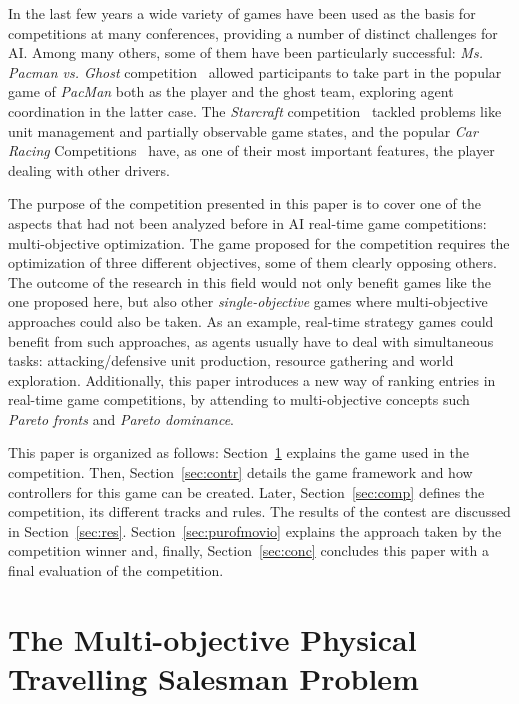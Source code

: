 \documentclass[conference]{IEEEtran}
\begin{document}
In the last few years a wide variety of games have been used as the basis for competitions at many conferences, providing a number of distinct challenges for AI. Among many others, some of them have been particularly successful: \textit{Ms. Pacman vs. Ghost} competition~\cite{Philipp2011} allowed participants to take part in the popular game of \textit{PacMan} both as the player and the ghost team, exploring agent coordination in the latter case. The \textit{Starcraft} competition~\cite{Weber2011} tackled problems like unit management and partially observable game states, and the popular \textit{Car Racing} Competitions~\cite{Loiacono2010} have, as one of their most important features, the player dealing with other drivers.

The purpose of the competition presented in this paper is to cover one of the aspects that had not been analyzed before in AI real-time game competitions: multi-objective optimization. The game proposed for the competition requires the optimization of three different objectives, some of them clearly opposing others. The outcome of the research in this field would not only benefit games like the one proposed here, but also other \textit{single-objective} games where multi-objective approaches could also be taken. As an example, real-time strategy games could benefit from such approaches, as agents usually have to deal with simultaneous tasks: attacking/defensive unit production, resource gathering and world exploration. Additionally, this paper introduces a new way of ranking entries in real-time game competitions, by attending to multi-objective concepts such \textit{Pareto fronts} and \textit{Pareto dominance}.

This paper is organized as follows: Section~\ref{sec:moptsp} explains the game used in the competition. Then, Section~\ref{sec:contr} details the game framework and how controllers for this game can be created. Later, Section~\ref{sec:comp} defines the competition, its different tracks and rules. The results of the contest are discussed in Section~\ref{sec:res}. Section~\ref{sec:purofmovio} explains the approach taken by the competition winner and, finally, Section~\ref{sec:conc} concludes this paper with a final evaluation of the competition.

\section{The Multi-objective Physical Travelling Salesman Problem} \label{sec:moptsp}
\end{document}
